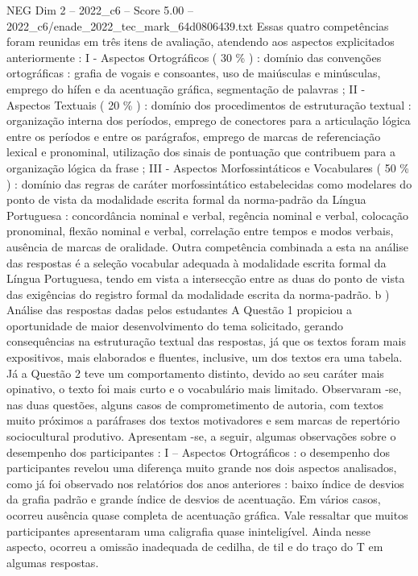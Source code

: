 \begin{textsample}{NEG Dim 2 – 2022\_c6 – Score 5.00 – 2022\_c6/enade\_2022\_tec\_mark\_64d0806439.txt}
Essas quatro competências foram reunidas em três itens de avaliação, atendendo aos aspectos explicitados anteriormente : I - Aspectos Ortográficos ( 30 \% ) : domínio das convenções ortográficas : grafia de vogais e consoantes, uso de maiúsculas e minúsculas, emprego do hífen e da acentuação gráfica, segmentação de palavras ; II - Aspectos Textuais ( 20 \% ) : domínio dos procedimentos de estruturação textual : organização interna dos períodos, emprego de conectores para a articulação lógica entre os períodos e entre os parágrafos, emprego de marcas de referenciação lexical e pronominal, utilização dos sinais de pontuação que contribuem para a organização lógica da frase ; III - Aspectos Morfossintáticos e Vocabulares ( 50 \% ) : domínio das regras de caráter morfossintático estabelecidas como modelares do ponto de vista da modalidade escrita formal da norma-padrão da Língua Portuguesa : concordância nominal e verbal, regência nominal e verbal, colocação pronominal, flexão nominal e verbal, correlação entre tempos e modos verbais, ausência de marcas de oralidade.
Outra competência combinada a esta na análise das respostas é a seleção vocabular adequada à modalidade escrita formal da Língua Portuguesa, tendo em vista a intersecção entre as duas do ponto de vista das exigências do registro formal da modalidade escrita da norma-padrão. b ) Análise das respostas dadas pelos estudantes A Questão 1 propiciou a oportunidade de maior desenvolvimento do tema solicitado, gerando consequências na estruturação textual das respostas, já que os textos foram mais expositivos, mais elaborados e fluentes, inclusive, um dos textos era uma tabela.
Já a Questão 2 teve um comportamento distinto, devido ao seu caráter mais opinativo, o texto foi mais curto e o vocabulário mais limitado.
Observaram -se, nas duas questões, alguns casos de comprometimento de autoria, com textos muito próximos a paráfrases dos textos motivadores e sem marcas de repertório sociocultural produtivo.
Apresentam -se, a seguir, algumas observações sobre o desempenho dos participantes : I – Aspectos Ortográficos : o desempenho dos participantes revelou uma diferença muito grande nos dois aspectos analisados, como já foi observado nos relatórios dos anos anteriores : baixo índice de desvios da grafia padrão e grande índice de desvios de acentuação.
Em vários casos, ocorreu ausência quase completa de acentuação gráfica.
Vale ressaltar que muitos participantes apresentaram uma caligrafia quase ininteligível.
Ainda nesse aspecto, ocorreu a omissão inadequada de cedilha, de til e do traço do T em algumas respostas.

\end{textsample}
